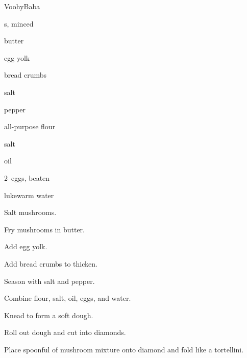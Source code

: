 \begin{recipe}{Voohy}{Baba}{}

\begin{ingredients}
\item {}s, minced
\item butter
\item egg yolk
\item bread crumbs
\item salt
\item pepper

\item {} all-purpose flour
\item \tp{1\half} salt
\item {} oil
\item 2~eggs, beaten
\item \C{1\half} lukewarm water
\end{ingredients}

\begin{directions}
\item Salt mushrooms.
\item Fry mushrooms in butter.
\item Add egg yolk.
\item Add bread crumbs to thicken.
\item Season with salt and pepper.
\item Combine flour, \tp{1\half} salt, oil, eggs, and water.
\item Knead to form a soft dough.
\item Roll out dough and cut into diamonds.
\item Place spoonful of mushroom mixture onto diamond and fold like a tortellini.
\end{directions}

\end{recipe}
